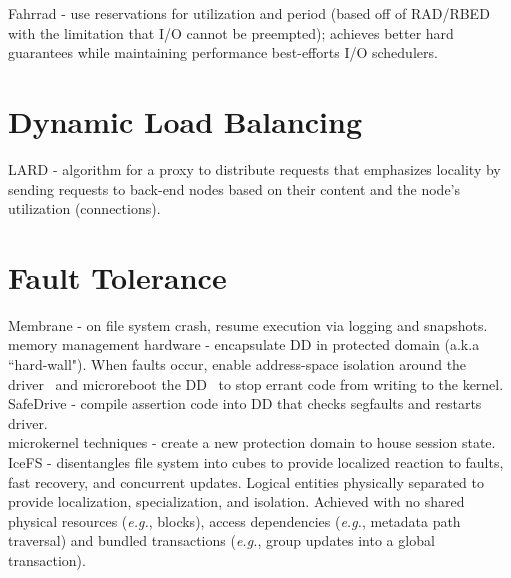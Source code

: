 \documentclass{article}
\begin{document}
\noindent\cite{povzer:eurosys2008-fahrrad} Fahrrad - use reservations for utilization and period (based off of RAD/RBED with the limitation that I/O cannot be preempted); achieves better hard guarantees while maintaining performance best-efforts I/O schedulers. \\

\section{Dynamic Load Balancing}
\noindent\cite{pai:asplos1998-lard} LARD - algorithm for a proxy to distribute requests that emphasizes locality by sending requests to back-end nodes based on their content and the node's utilization (connections). \\



\section{Fault Tolerance}

\noindent\cite{sundararaman:fast2010-membrane} Membrane - on file system crash, resume execution via logging and snapshots. \\

\noindent\cite{swift:sosp2003-nook, swift:osdi2004-shadow-drivers} memory management hardware - encapsulate DD in protected domain (a.k.a ``hard-wall"). When faults occur, enable address-space isolation around the driver~\cite{swift:sosp2003-nook} and microreboot the DD~\cite{swift:osdi2004-shadow-drivers} to stop errant code from writing to the kernel. \\

\noindent\cite{zhou:osdi2006-safedrive} SafeDrive - compile assertion code into DD that checks segfaults and restarts driver.\\

\noindent\cite{david:osdi2008-curios} microkernel techniques - create a new protection domain to house session state.\\

\noindent\cite{lu:osdi2014-icefs} IceFS - disentangles file system into cubes to provide localized reaction to faults, fast recovery, and concurrent updates. Logical entities physically separated to provide localization, specialization, and isolation. Achieved with no shared physical resources ({\it e.g.}, blocks), access dependencies ({\it e.g.}, metadata path traversal) and bundled transactions ({\it e.g.}, group updates into a global transaction). 
\end{document}

